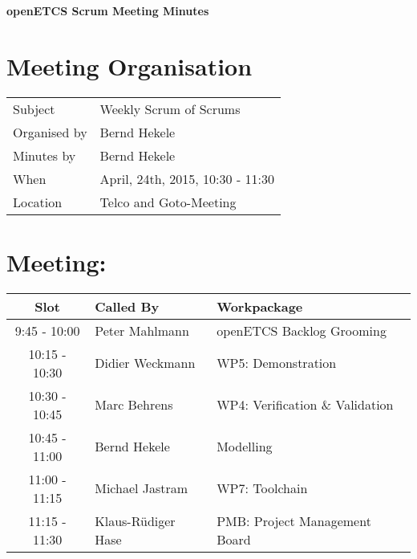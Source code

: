 \documentclass[a4paper, 11pt]{article}
\begin{document}
{\begin{center}\huge\bf openETCS Scrum Meeting Minutes\end{center}}
\section{Meeting Organisation}

\renewcommand{\arraystretch}{1.5}
\begin{supertabular}{m{.2\textwidth}m{.8\textwidth}}
Subject & Weekly Scrum of Scrums\\
Organised by &Bernd Hekele\\
Minutes by & Bernd Hekele\\
When & April, 24th, 2015, 10:30 - 11:30\\
Location & Telco and Goto-Meeting\\
\end{supertabular}

\renewcommand{\arraystretch}{1.0}
\section{Meeting:}

\begin{tabular}{|c|l|l|}
\hline
\textbf{Slot} &  \textbf{Called By} & \textbf{Workpackage} \\
\hline  
9:45 - 10:00 & Peter Mahlmann & openETCS Backlog Grooming  \\\hline
10:15 - 10:30 & Didier Weckmann & WP5: Demonstration \\\hline  
10:30 - 10:45 & Marc Behrens & WP4: Verification \& Validation \\\hline  
10:45 - 11:00 & Bernd Hekele & Modelling \\\hline  
11:00 - 11:15 & Michael Jastram  & WP7: Toolchain \\\hline
11:15 - 11:30 & Klaus-R\"udiger Hase & PMB: Project Management Board \\\hline  
\end{tabular}
\end{document}
